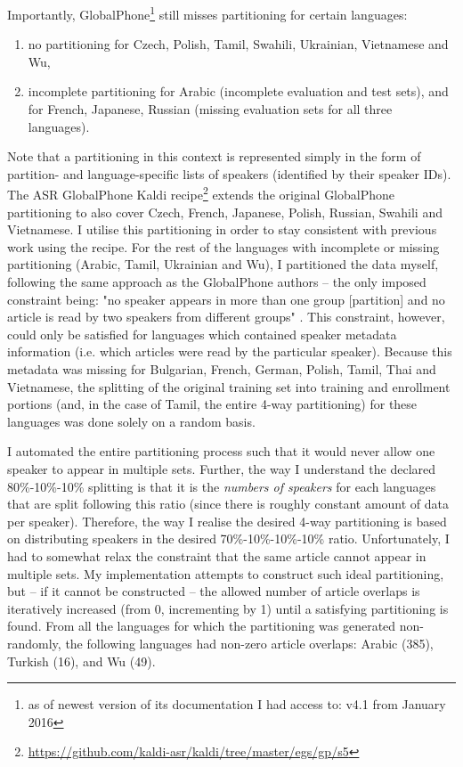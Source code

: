 \documentclass[bsc,frontabs,twoside,singlespacing,parskip,deptreport]{infthesis}
\begin{document}
{{    Importantly, GlobalPhone\footnote{as of newest version of its documentation I had access to: v4.1 from January 2016} still misses partitioning for certain languages:
    \begin{enumerate}
      \item {no partitioning for Czech, Polish, Tamil, Swahili, Ukrainian, Vietnamese and Wu,}
      \item {incomplete partitioning for Arabic (incomplete evaluation and test sets), and for French, Japanese, Russian (missing evaluation sets for all three languages).}
    \end{enumerate}
    Note that a partitioning in this context is represented simply in the form of partition- and language-specific lists of speakers (identified by their speaker IDs).
    The ASR GlobalPhone Kaldi recipe\footnote{\url{https://github.com/kaldi-asr/kaldi/tree/master/egs/gp/s5}} extends the original GlobalPhone partitioning to also cover Czech, French, Japanese, Polish, Russian, Swahili and Vietnamese. I utilise this partitioning in order to stay consistent with previous work using the recipe. For the rest of the languages with incomplete or missing partitioning (Arabic, Tamil, Ukrainian and Wu), I partitioned the data myself, following the same approach as the GlobalPhone authors -- the only imposed constraint being: "no speaker appears in more than one group [partition] and no article is read by two speakers from different groups" \citep[p. 348]{Schultz_2002}. This constraint, however, could only be satisfied for languages which contained speaker metadata information (i.e. which articles were read by the particular speaker). Because this metadata was missing for Bulgarian, French, German, Polish, Tamil, Thai and Vietnamese, the splitting of the original training set into training and enrollment portions (and, in the case of Tamil, the entire 4-way partitioning) for these languages was done solely on a random basis.

    I automated the entire partitioning process such that it would never allow one speaker to appear in multiple sets. Further, the way I understand the declared 80\%-10\%-10\% splitting is that it is the \textit{numbers of speakers} for each languages that are split following this ratio (since there is roughly constant amount of data per speaker). Therefore, the way I realise the desired 4-way partitioning is based on distributing speakers in the desired 70\%-10\%-10\%-10\% ratio. Unfortunately, I had to somewhat relax the constraint that the same article cannot appear in multiple sets. My implementation attempts to construct such ideal partitioning, but -- if it cannot be constructed -- the allowed number of article overlaps is iteratively increased (from 0, incrementing by 1) until a satisfying partitioning is found.
    From all the languages for which the partitioning was generated non-randomly, the following languages had non-zero article overlaps: Arabic (385), Turkish (16), and Wu (49). %

}}
\end{document}
